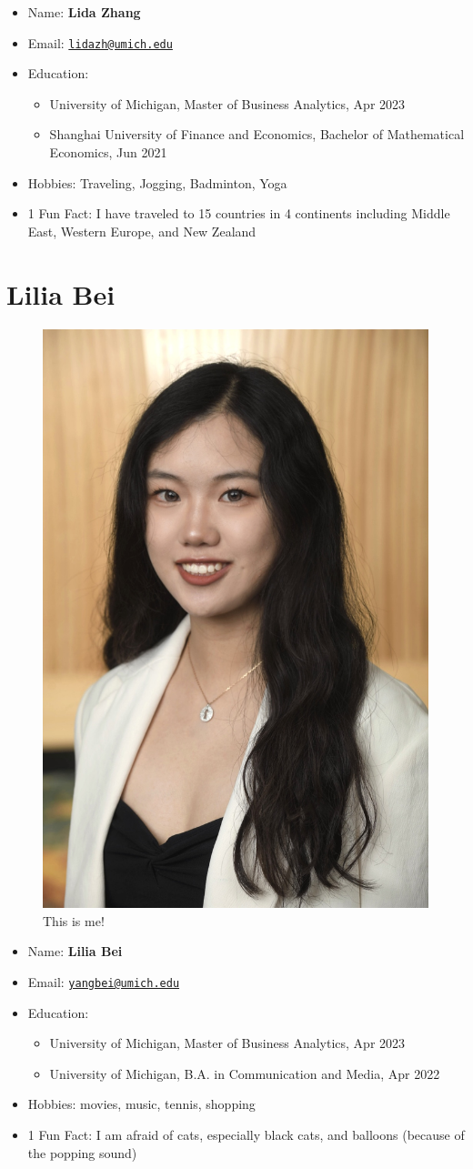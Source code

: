 \documentclass[
]{book}
\begin{document}
\begin{itemize}
\item
  Name: \textbf{Lida Zhang}
\item
  Email: \href{mailto:lidazh@umich.edu}{\nolinkurl{lidazh@umich.edu}}
\item
  Education:

  \begin{itemize}
  \item
    University of Michigan, Master of Business Analytics, Apr 2023
  \item
    Shanghai University of Finance and Economics, Bachelor of Mathematical Economics, Jun 2021
  \end{itemize}
\item
  Hobbies: Traveling, Jogging, Badminton, Yoga
\item
  1 Fun Fact: I have traveled to 15 countries in 4 continents including Middle East, Western Europe, and New Zealand
\end{itemize}

\hypertarget{lilia-bei}{%
\section{Lilia Bei}\label{lilia-bei}}

\begin{figure}
\includegraphics[width=0.2\linewidth,height=0.2\textheight]{lilia} \caption{This is me!}\label{fig:unnamed-chunk-6}
\end{figure}

\begin{itemize}
\item
  Name: \textbf{Lilia Bei}
\item
  Email: \href{mailto:yangbei@umich.edu}{\nolinkurl{yangbei@umich.edu}}
\item
  Education:

  \begin{itemize}
  \item
    University of Michigan, Master of Business Analytics, Apr 2023
  \item
    University of Michigan, B.A. in Communication and Media, Apr 2022
  \end{itemize}
\item
  Hobbies: movies, music, tennis, shopping
\item
  1 Fun Fact: I am afraid of cats, especially black cats, and balloons (because of the popping sound)
\end{itemize}
\end{document}
